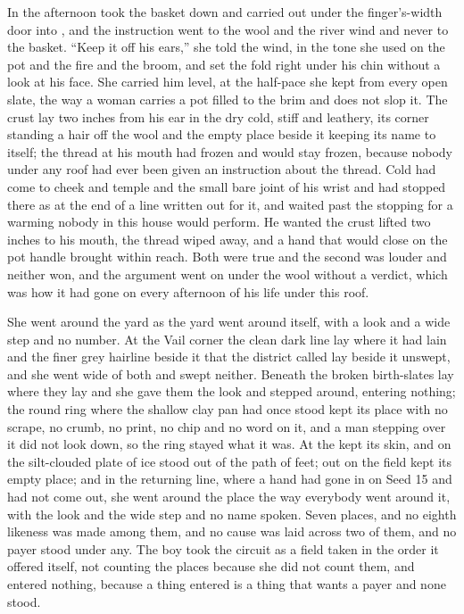 In the afternoon  took the basket down and carried  out under the finger's-width door into , and the instruction went to the wool and the river wind and never to the basket. “Keep it off his ears,” she told the wind, in the tone she used on the pot and the fire and the broom, and set the fold right under his chin without a look at his face. She carried him level, at the half-pace she kept from every open slate, the way a woman carries a pot filled to the brim and does not slop it. The crust lay two inches from his ear in the dry cold, stiff and leathery, its corner standing a hair off the wool and the empty place beside it keeping its name to itself; the thread at his mouth had frozen and would stay frozen, because nobody under any roof had ever been given an instruction about the thread. Cold had come to cheek and temple and the small bare joint of his wrist and had stopped there as at the end of a line written out for it, and  waited past the stopping for a warming nobody in this house would perform. He wanted the crust lifted two inches to his mouth, the thread wiped away, and a hand that would close on the pot handle brought within reach. Both were true and the second was louder and neither won, and the argument went on under the wool without a verdict, which was how it had gone on every afternoon of his life under this roof.

She went around the yard as the yard went around itself, with a look and a wide step and no number. At the Vail corner the clean dark line lay where it had lain and the finer grey hairline beside it that the district called  lay beside it unswept, and she went wide of both and swept neither. Beneath  the broken birth-slates lay where they lay and she gave them the look and stepped around, entering nothing; the round ring where the shallow clay pan had once stood kept its place with no scrape, no crumb, no print, no chip and no word on it, and a man stepping over it did not look down, so the ring stayed what it was. At  the  kept its skin, and on  the silt-clouded plate of ice stood out of the path of feet; out on  the field kept its empty place; and in the returning line, where a hand had gone in on Seed 15 and had not come out, she went around the place the way everybody went around it, with the look and the wide step and no name spoken. Seven places, and no eighth likeness was made among them, and no cause was laid across two of them, and no payer stood under any. The boy took the circuit as a field taken in the order it offered itself, not counting the places because she did not count them, and entered nothing, because a thing entered is a thing that wants a payer and none stood.


